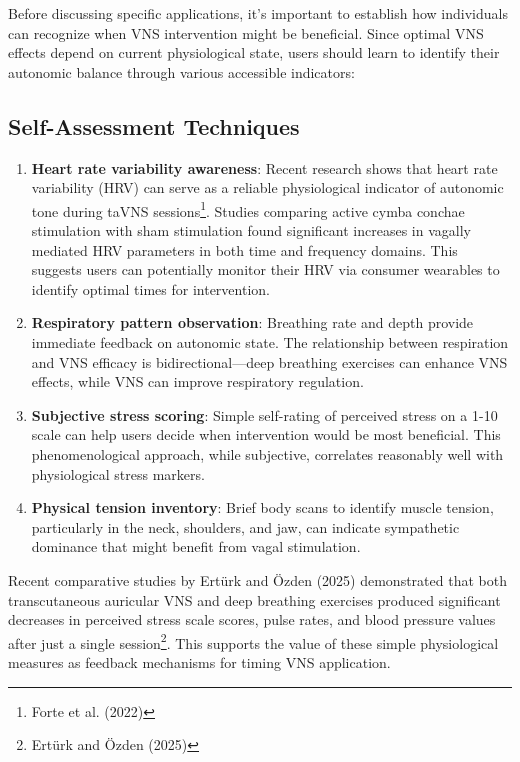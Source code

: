 \documentclass[
  Letterpaper,
]{scrbook}
\begin{document}
Before discussing specific applications, it's important to establish how
individuals can recognize when VNS intervention might be beneficial.
Since optimal VNS effects depend on current physiological state, users
should learn to identify their autonomic balance through various
accessible indicators:

\subsection{Self-Assessment
Techniques}\label{self-assessment-techniques}

\begin{enumerate}
\def\labelenumi{\arabic{enumi}.}
\item
  \textbf{Heart rate variability awareness}: Recent research shows that
  heart rate variability (HRV) can serve as a reliable physiological
  indicator of autonomic tone during taVNS sessions\footnote{Forte et
    al. (2022)}. Studies comparing active cymba conchae stimulation with
  sham stimulation found significant increases in vagally mediated HRV
  parameters in both time and frequency domains. This suggests users can
  potentially monitor their HRV via consumer wearables to identify
  optimal times for intervention.
\item
  \textbf{Respiratory pattern observation}: Breathing rate and depth
  provide immediate feedback on autonomic state. The relationship
  between respiration and VNS efficacy is bidirectional---deep breathing
  exercises can enhance VNS effects, while VNS can improve respiratory
  regulation.
\item
  \textbf{Subjective stress scoring}: Simple self-rating of perceived
  stress on a 1-10 scale can help users decide when intervention would
  be most beneficial. This phenomenological approach, while subjective,
  correlates reasonably well with physiological stress markers.
\item
  \textbf{Physical tension inventory}: Brief body scans to identify
  muscle tension, particularly in the neck, shoulders, and jaw, can
  indicate sympathetic dominance that might benefit from vagal
  stimulation.
\end{enumerate}

Recent comparative studies by Ertürk and Özden (2025) demonstrated that
both transcutaneous auricular VNS and deep breathing exercises produced
significant decreases in perceived stress scale scores, pulse rates, and
blood pressure values after just a single session\footnote{Ertürk and
  Özden (2025)}. This supports the value of these simple physiological
measures as feedback mechanisms for timing VNS application.
\end{document}
